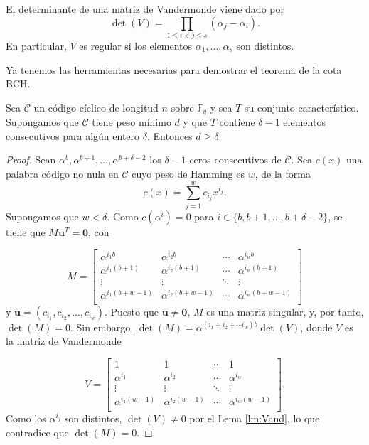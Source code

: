 \begin{lema}\label{lm:Vand}
El determinante de una matriz de Vandermonde viene dado por $$ \det (V) = \prod_{1\leq i < j \leq s}(\alpha_j - \alpha_i).$$
En particular, $V$ es regular si los elementos $\alpha_1,\dots,\alpha_s$ son distintos.
\end{lema}

Ya tenemos las herramientas necesarias para demostrar el teorema de la cota BCH.

\begin{teorema}\label{th:cota}
Sea $\mathcal{C}$ un código cíclico de longitud $n$ sobre $\mathbb{F}_q$ y sea $T$ su conjunto característico. Supongamos que $\mathcal{C}$ tiene peso mínimo $d$ y que $T$ contiene $\delta - 1$ elementos consecutivos para algún entero $\delta$. Entonces $d \geq \delta$.
\end{teorema}

\begin{proof}

Sean $\alpha^b,\alpha^{b+1},\dots,\alpha^{b+\delta-2}$ los $\delta - 1$ ceros consecutivos de $\mathcal{C}$. Sea $c(x)$ una palabra código no nula en $\mathcal{C}$ cuyo peso de Hamming es $w$, de la forma
$$c(x) = \sum_{j=1}^{w}c_{i_j}x^{i_j}.$$
Supongamos que $w < \delta$. Como $c(\alpha^i) = 0$ para $i \in \{b,b+1,\dots,b+\delta - 2\}$, se tiene que $M\mathbf{u}^T = \mathbf{0}$, con 

$$M = \left[
\begin{array}{cccc}
\alpha^{i_1 b} & \alpha^{i_2b} & \cdots & \alpha^{i_wb} \\
\alpha^{i_1 (b+1)} & \alpha^{i_2(b+1)} & \cdots & \alpha^{i_w(b+1)} \\
\vdots & \vdots & \ddots & \vdots \\
\alpha^{i_1(b+w-1)} & \alpha^{i_2(b+w-1)} & \cdots & \alpha^{i_w(b+w-1)} \\
\end{array}
\right]$$
y $\mathbf{u} = (c_{i_1},c_{i_2},\dots,c_{i_w})$. Puesto que $\mathbf{u} \neq \mathbf{0}$, $M$ es una matriz singular, y, por tanto, $\det(M)=0$. Sin embargo, $\det(M) = \alpha^{(i_1+i_2+\cdots i_w)b}\det(V)$, donde $V$ es la matriz de Vandermonde 

$$V = \left[
\begin{array}{cccc}
1 & 1 & \cdots & 1 \\
\alpha^{i_1} & \alpha^{i_2} & \cdots & \alpha^{i_w} \\
\vdots & \vdots & \ddots & \vdots \\
\alpha^{i_1(w-1)} & \alpha^{i_2(w-1)} & \cdots & \alpha^{i_w(w-1)} \\
\end{array}
\right].$$
Como los $\alpha^{i_j}$ son distintos, $\det(V) \neq 0$ por el Lema \ref{lm:Vand}, lo que contradice que $\det(M) = 0$.
\end{proof}

